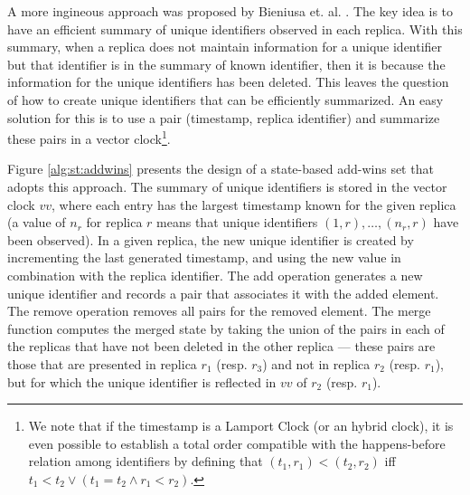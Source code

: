 \documentclass[12pt]{article}
\begin{document}
A more ingineous approach was proposed by Bieniusa et. al. \cite{Bieniusa12Optimized}.
The key idea is to have an efficient summary of unique identifiers observed
in each replica. With this summary, when a replica does not maintain information
for a unique identifier but that identifier is in the summary of known identifier,
then it is because the information for the unique identifiers has been deleted.
This leaves the question of how to create unique identifiers that can be 
efficiently summarized. 
An easy solution for this is to use a pair (timestamp, replica identifier)
and summarize these pairs in a vector clock\footnote{We note that if the 
timestamp is a Lamport Clock \cite{Lamport78Time} (or an 
hybrid clock), it is even possible to establish a total order compatible with 
the happens-before relation among identifiers by defining that $(t_1,r_1) < (t_2,r_2)$
iff $t_1 < t_2 \vee ( t_1 = t_2 \wedge r_1 < r_2)$.}.

Figure \ref{alg:st:addwins} presents the design of a state-based add-wins
set that adopts this approach. 
The summary of unique identifiers is stored in the vector clock $vv$, where
each entry has the largest timestamp known for the given replica (a value of 
$n_r$ for replica $r$ means that unique identifiers $(1,r),\ldots,(n_r,r)$ have been
observed).
In a given replica, the new unique identifier is created by incrementing the last
generated timestamp, and using the new value in combination with the replica identifier.
The add operation generates a new unique identifier and records a pair that
associates it with the added element.
The remove operation removes all pairs for the removed element.
The merge function computes the merged state by taking the union of the pairs
in each of the replicas that have not been deleted in the other replica --- these
pairs are those that are presented in replica $r_1$ (resp. $r_3$) and not in 
replica $r_2$ (resp. $r_1$), but for which the
unique identifier is reflected in $vv$ of $r_2$ (resp. $r_1$).
\end{document}
